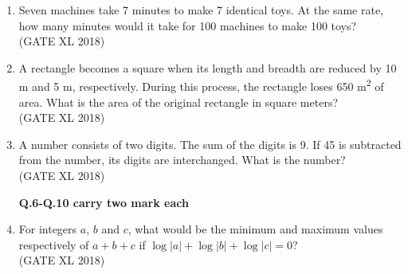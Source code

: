 \documentclass[14pt]{extarticle}
\begin{document}
\begin{flushleft}
\begin{enumerate}
\item Seven machines take 7 minutes to make 7 identical toys. At the same rate, how many minutes would it take for 100 machines to make 100 toys?\\
\hfill(GATE XL 2018)\\
\begin{enumerate}
\end{enumerate}

\item A rectangle becomes a square when its length and breadth are reduced by 10 m and 5 m, respectively. During this process, the rectangle loses 650 m\textsuperscript{2} of area. What is the area of the original rectangle in square meters?\\
\hfill(GATE XL 2018)\\
\begin{enumerate}
\end{enumerate}

\item A number consists of two digits. The sum of the digits is 9. If 45 is subtracted from the number, its digits are interchanged. What is the number?\\
\hfill(GATE XL 2018)\\
\begin{enumerate}
\end{enumerate}
\textbf{Q.6-Q.10 carry two mark each}
  

\item For integers $a$, $b$ and $c$, what would be the minimum and maximum values respectively of $a+b+c$ if $\log |a| + \log |b| + \log |c| = 0$?\\
\hfill(GATE XL 2018)\\
\begin{enumerate}
\end{enumerate}


\end{enumerate}
\end{flushleft}
\end{document}

